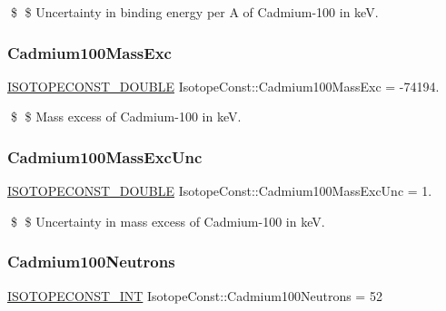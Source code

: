 \$ \$ Uncertainty in binding energy per A of Cadmium-\/100 in keV. \mbox{\label{group___isotope_const-_cadmium-_cd100_ga30185b342dbf0d7fed3c3ac3ca6a4028}} 
\subsubsection{\texorpdfstring{Cadmium100\+Mass\+Exc}{Cadmium100MassExc}}
{\footnotesize\ttfamily \mbox{\hyperlink{group___isotope_const-_macros_ga8f45a7272ce02c0b4c65c44636ed719a}{I\+S\+O\+T\+O\+P\+E\+C\+O\+N\+S\+T\+\_\+\+D\+O\+U\+B\+LE}} Isotope\+Const\+::\+Cadmium100\+Mass\+Exc = -\/74194.}

\$ \$ Mass excess of Cadmium-\/100 in keV. \mbox{\label{group___isotope_const-_cadmium-_cd100_ga6264c19d9ed5241931515657ad45a727}} 
\subsubsection{\texorpdfstring{Cadmium100\+Mass\+Exc\+Unc}{Cadmium100MassExcUnc}}
{\footnotesize\ttfamily \mbox{\hyperlink{group___isotope_const-_macros_ga8f45a7272ce02c0b4c65c44636ed719a}{I\+S\+O\+T\+O\+P\+E\+C\+O\+N\+S\+T\+\_\+\+D\+O\+U\+B\+LE}} Isotope\+Const\+::\+Cadmium100\+Mass\+Exc\+Unc = 1.}

\$ \$ Uncertainty in mass excess of Cadmium-\/100 in keV. \mbox{\label{group___isotope_const-_cadmium-_cd100_ga27f148f239119cf5a1810e396bb69894}} 
\subsubsection{\texorpdfstring{Cadmium100\+Neutrons}{Cadmium100Neutrons}}
{\footnotesize\ttfamily \mbox{\hyperlink{group___isotope_const-_macros_ga5f18360b3e99483a35c32d789e62621c}{I\+S\+O\+T\+O\+P\+E\+C\+O\+N\+S\+T\+\_\+\+I\+NT}} Isotope\+Const\+::\+Cadmium100\+Neutrons = 52}

